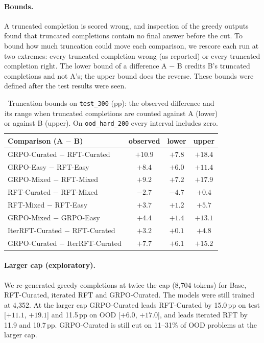 \documentclass{article}
\begin{document}
\paragraph{Bounds.} A truncated completion is scored wrong, and inspection of the greedy outputs found that truncated completions contain no final answer before the cut. To bound how much truncation could move each comparison, we rescore each run at two extremes: every truncated completion wrong (as reported) or every truncated completion right. The lower bound of a difference A $-$ B credits B's truncated completions and not A's; the upper bound does the reverse. These bounds were defined after the test results were seen.

\begin{table}[!ht]
\centering\small
\caption{Truncation bounds on \texttt{test\_300} (pp): the observed difference and its range when truncated completions are counted against A (lower) or against B (upper). On \texttt{ood\_hard\_200} every interval includes zero.}
\label{tab:bounds}
\begin{tabular}{lccc}
\toprule
Comparison (A $-$ B) & observed & lower & upper \\
\midrule
GRPO-Curated $-$ RFT-Curated & $+10.9$ & $+7.8$ & $+18.4$ \\
GRPO-Easy $-$ RFT-Easy       & $+8.4$  & $+6.0$ & $+11.4$ \\
GRPO-Mixed $-$ RFT-Mixed     & $+9.2$  & $+7.2$ & $+17.9$ \\
RFT-Curated $-$ RFT-Mixed    & $-2.7$  & $-4.7$ & $+0.4$ \\
RFT-Mixed $-$ RFT-Easy       & $+3.7$  & $+1.2$ & $+5.7$ \\
GRPO-Mixed $-$ GRPO-Easy     & $+4.4$  & $+1.4$ & $+13.1$ \\
IterRFT-Curated $-$ RFT-Curated & $+3.2$ & $+0.1$ & $+4.8$ \\
GRPO-Curated $-$ IterRFT-Curated & $+7.7$ & $+6.1$ & $+15.2$ \\
\bottomrule
\end{tabular}
\end{table}

\paragraph{Larger cap (exploratory).} We re-generated greedy completions at twice the cap (8{,}704 tokens) for Base, RFT-Curated, iterated RFT and GRPO-Curated. The models were still trained at 4{,}352. At the larger cap GRPO-Curated leads RFT-Curated by 15.0\,pp on test [$+11.1$, $+19.1$] and 11.5\,pp on OOD [$+6.0$, $+17.0$], and leads iterated RFT by 11.9 and 10.7\,pp. GRPO-Curated is still cut on 11--31\% of OOD problems at the larger cap.
\end{document}
